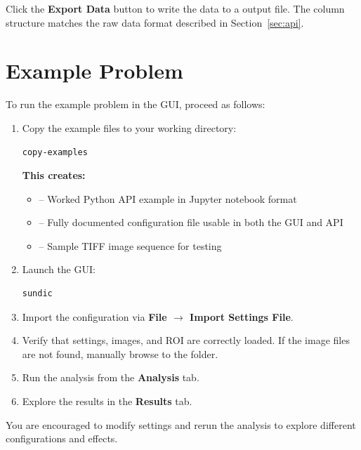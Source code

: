 Click the \textbf{Export Data} button to write the data to a  output file. The column structure matches the raw data format described in Section~\ref{sec:api}.

\section{Example Problem}

To run the example problem in the GUI, proceed as follows:

\begin{enumerate}
	\item Copy the example files to your working directory:
	
\begin{lstlisting}[language=bash]
copy-examples
\end{lstlisting}
	
	\textbf{This creates:}
	
	\begin{itemize}
		\item {} -- Worked Python API example in Jupyter notebook format
		\item {} -- Fully documented configuration file usable in both the GUI and API
		\item {} -- Sample TIFF image sequence for testing
	\end{itemize}
	
	\item Launch the GUI:
	
\begin{lstlisting}[language=bash]
sundic
\end{lstlisting}
	
	\item Import the  configuration via \textbf{File $\rightarrow$ Import Settings File}.
	
	\item Verify that settings, images, and ROI are correctly loaded. If the image files are not found, manually browse to the  folder.
	
	\item Run the analysis from the \textbf{Analysis} tab.
	
	\item Explore the results in the \textbf{Results} tab.
	
\end{enumerate}

You are encouraged to modify settings and rerun the analysis to explore different configurations and effects.

